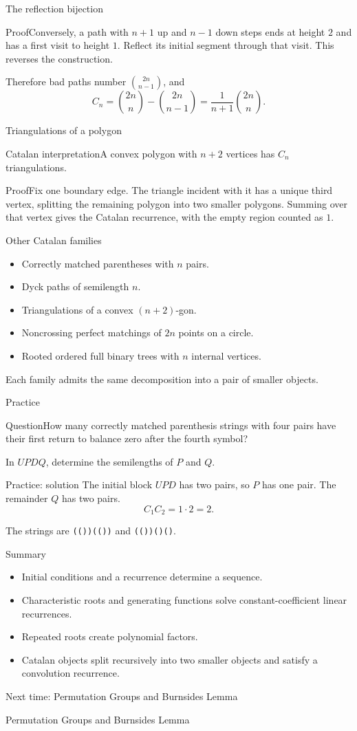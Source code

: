 \documentclass[aspectratio=169,11pt]{beamer}
\newcommand{\Thm}[2]{\begin{block}{#1}#2\end{block}}
\renewcommand{\Proof}[1]{\begin{block}{Proof}\normalsize #1\end{block}}
\newcommand{\Question}[1]{\begin{block}{Question}#1\end{block}}
\newcommand{\gap}{\par\medskip}
\begin{document}
\begin{frame}{The reflection bijection}
\large
\Proof{Conversely, a path with $n+1$ up and $n-1$ down steps ends at height $2$ and has a first visit to height $1$. Reflect its initial segment through that visit. This reverses the construction.\gap Therefore bad paths number $\binom{2n}{n-1}$, and
\[C_n=\binom{2n}n-\binom{2n}{n-1}=\frac1{n+1}\binom{2n}n.\]}
\end{frame}
\begin{frame}{Triangulations of a polygon}
\large
\Thm{Catalan interpretation}{A convex polygon with $n+2$ vertices has $C_n$ triangulations.}
\Proof{Fix one boundary edge. The triangle incident with it has a unique third vertex, splitting the remaining polygon into two smaller polygons. Summing over that vertex gives the Catalan recurrence, with the empty region counted as $1$.}
\end{frame}
\begin{frame}{Other Catalan families}
\large
\begin{itemize}
\item Correctly matched parentheses with $n$ pairs.
\item Dyck paths of semilength $n$.
\item Triangulations of a convex $(n+2)$-gon.
\item Noncrossing perfect matchings of $2n$ points on a circle.
\item Rooted ordered full binary trees with $n$ internal vertices.
\end{itemize}
\gap Each family admits the same decomposition into a pair of smaller objects.
\end{frame}
\begin{frame}{Practice}
\large
\Question{How many correctly matched parenthesis strings with four pairs have their first return to balance zero after the fourth symbol?}
\gap In $U P D Q$, determine the semilengths of $P$ and $Q$.
\end{frame}
\begin{frame}{Practice: solution}
\large
The initial block $UPD$ has two pairs, so $P$ has one pair. The remainder $Q$ has two pairs.
\[C_1C_2=1\cdot2=2.\]
\gap The strings are \texttt{(())(())} and \texttt{(())()()}.
\end{frame}
\begin{frame}{Summary}
\large
\begin{itemize}
\item Initial conditions and a recurrence determine a sequence.
\item Characteristic roots and generating functions solve constant-coefficient linear recurrences.
\item Repeated roots create polynomial factors.
\item Catalan objects split recursively into two smaller objects and satisfy a convolution recurrence.
\end{itemize}
\end{frame}
\begin{frame}{Next time: Permutation Groups and Burnside\textquotesingle s Lemma}\begin{center}{\Huge Permutation Groups and Burnside\textquotesingle s Lemma}\end{center}\end{frame}
\end{document}
